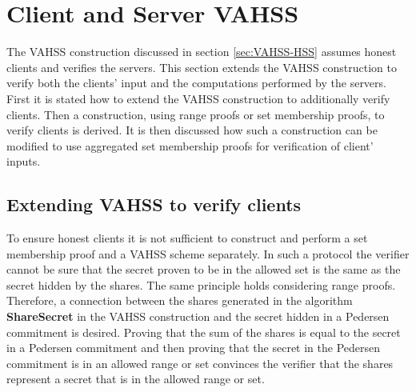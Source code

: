 \section{Client and Server VAHSS}
The VAHSS construction discussed in section \ref{sec:VAHSS-HSS} assumes honest clients and verifies the servers. This section extends the VAHSS construction to verify both the clients' input and the computations performed by the servers. First it is stated how to extend the VAHSS construction to additionally verify clients. Then a construction, using range proofs or set membership proofs, to verify clients is derived. It is then discussed how such a construction can be modified to use aggregated set membership proofs for verification of client' inputs. 



\subsection*{Extending VAHSS to verify clients}
To ensure honest clients it is not sufficient to construct and perform a set membership proof and a VAHSS scheme separately. In such a protocol the verifier cannot be sure that the secret proven to be in the allowed set is the same as the secret hidden by the shares. The same principle holds considering range proofs. Therefore, a connection between the shares generated in the algorithm \textbf{ShareSecret} in the VAHSS construction and the secret hidden in a Pedersen commitment is desired. Proving that the sum of the shares is equal to the secret in a Pedersen commitment and then proving that the secret in the Pedersen commitment is in an allowed range or set convinces the verifier that the shares represent a secret that is in the allowed range or set. %

